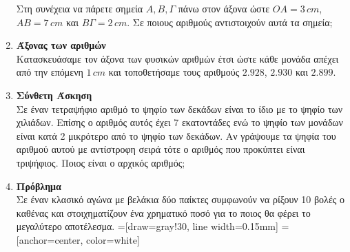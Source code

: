 \documentclass[twoside,nofonts,internet]{askhseis}
\newcommand{\tss}[1]{\textsuperscript{#1}}
\begin{document}
\begin{enumerate}[itemsep=5mm]
\begin{center}
\end{center}
Στη συνέχεια να πάρετε σημεία $ A,B,\varGamma $ πάνω στον άξονα ώστε $ OA=3\,cm $, $ AB=7\,cm $ και $ B\varGamma=2\,cm $. Σε ποιους αριθμούς αντιστοιχούν αυτά τα σημεία;
\item \textbf{Άξονας των αριθμών}\\
Κατασκευάσαμε τον άξονα των φυσικών αριθμών έτσι ώστε κάθε μονάδα απέχει από την επόμενη $ 1\,cm $ και τοποθετήσαμε τους αριθμούς $ 2.928 $, $ 2.930 $ και $ 2.899 $.
\item \textbf{Σύνθετη Άσκηση}\\
Σε έναν τετραψήφιο αριθμό το ψηφίο των δεκάδων είναι το ίδιο με το ψηφίο των χιλιάδων. Επίσης ο αριθμός αυτός έχει 7 εκατοντάδες ενώ το ψηφίο των μονάδων είναι κατά 2 μικρότερο από το ψηφίο των δεκάδων. Αν γράψουμε τα ψηφία του αριθμού αυτού με αντίστροφη σειρά τότε ο αριθμός που προκύπτει είναι τριψήφιος. Ποιος είναι ο αρχικός αριθμός;
\item \textbf{Πρόβλημα}\\
Σε έναν κλασικό αγώνα με βελάκια δύο παίκτες συμφωνούν να ρίξουν 10 βολές ο καθένας και στοιχηματίζουν ένα χρηματικό ποσό για το ποιος θα φέρει το μεγαλύτερο αποτέλεσμα.
=[draw=gray!30, line width=0.15mm]
=[anchor=center, color=white]

\newcommand{\strip}[4]{
	\filldraw[#1, wired]
	({18 *  #2}      :                   #3) arc
	({18 *  #2}      : {18 * (#2 + 1)} : #3) --
	({18 * (#2 + 1)} :                   #4) arc
	({18 * (#2 + 1)} : {18 *  #2}      : #4) -- cycle;
}

\newcommand{\sector}[3]{
	\filldraw[#1, wired]
	(0, 0) --
	({18 * #2} :                   #3) arc
	({18 * #2} : {18 * (#2 + 1)} : #3) -- cycle;
}


\begin{center}
	\begin{tikzpicture}[rotate=81, scale=.09]


\end{tikzpicture}
\end{center}
\end{enumerate}
\end{document}
